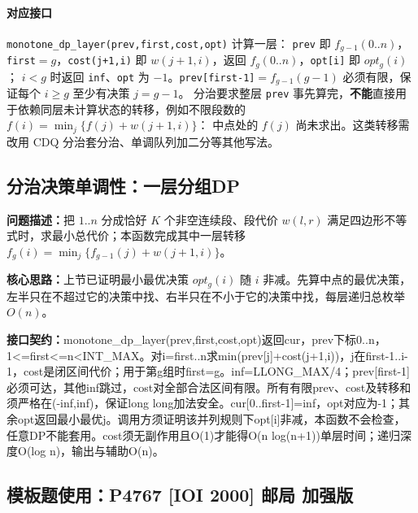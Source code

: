 \paragraph{对应接口} \texttt{monotone\_dp\_layer(prev,first,cost,opt)} 计算一层：
\texttt{prev} 即 $f_{g-1}(0..n)$，\texttt{first}$=g$，\texttt{cost(j+1,i)} 即 $w(j+1,i)$，返回 $f_g(0..n)$，\texttt{opt[i]} 即 $opt_g(i)$；
$i<g$ 时返回 \texttt{inf}、\texttt{opt} 为 $-1$。\texttt{prev[first-1]}$=f_{g-1}(g-1)$ 必须有限，保证每个 $i\ge g$ 至少有决策 $j=g-1$。
分治要求整层 \texttt{prev} 事先算完，\textbf{不能}直接用于依赖同层未计算状态的转移，例如不限段数的 $f(i)=\min_j\{f(j)+w(j+1,i)\}$：
中点处的 $f(j)$ 尚未求出。这类转移需改用 CDQ 分治套分治、单调队列加二分等其他写法。



\Needspace{527pt}

\subsection{分治决策单调性：一层分组DP}\label{compact-monotone_dp_layer}

\noindent\textbf{问题描述：}\allowbreak 把 $1..n$ 分成恰好 $K$ 个非空连续段、段代价 $w(l,r)$ 满足四边形不等式时，求最小总代价；本函数完成其中一层转移 $f_g(i)=\min_{j}\{f_{g-1}(j)+w(j+1,i)\}$。

\textbf{核心思路：}\allowbreak 上节已证明最小最优决策 $opt_g(i)$ 随 $i$ 非减。先算中点的最优决策，左半只在不超过它的决策中找、右半只在不小于它的决策中找，每层递归总枚举 $O(n)$。



{\sloppy{}\noindent\textbf{接口契约：}monotone\_dp\_layer(prev,first,cost,opt)返回cur，prev下标0..n，1<=first<=n<INT\_MAX。对i=first..n求min(prev[j]+cost(j+1,i))，j在first-1..i-1，cost是闭区间代价；用于第g组时first=g。inf=LLONG\_MAX/4；prev[first-1]必须可达，其他inf跳过，cost对全部合法区间有限。所有有限prev、cost及转移和须严格在(-inf,inf)，保证long long加法安全。cur[0..first-1]=inf，opt对应为-1；其余opt返回最小最优j。调用方须证明该并列规则下opt[i]非减，本函数不会检查，任意DP不能套用。cost须无副作用且O(1)才能得O(n log(n+1))单层时间；递归深度O(log n)，输出与辅助O(n)。\par}



\Needspace{489pt}

\subsection*{模板题使用：P4767 [IOI 2000] 邮局 加强版}

